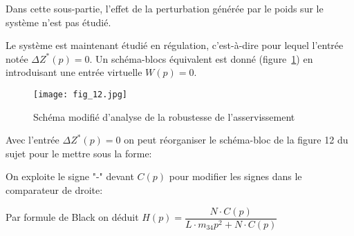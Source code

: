 Dans cette sous-partie, l'effet de la perturbation générée par le poids sur le système n'est pas étudié.

Le système est maintenant étudié en régulation, c'est-à-dire pour lequel l'entrée notée $\Delta Z^{*}(p)=0$. Un schéma-blocs équivalent est donné (figure~\ref{fig:12}) en introduisant une entrée virtuelle $W(p)=0$.

\begin{figure}[H]
\centering
\texttt{[image: fig\_12.jpg]}
\caption{\label{fig:12} Schéma modifié d'analyse de la robustesse de l'asservissement}
\end{figure}
\fi


\ifprof
\begin{corrige}
Avec l'entrée $\Delta Z^*(p) = 0$ on peut réorganiser le schéma-bloc de la figure 12 du sujet pour le mettre sous la forme:

\begin{center}
\end{center}

On exploite le signe "-" devant $C(p)$ pour modifier les signes dans le comparateur de droite:

\begin{center}
\end{center}

Par formule de Black on déduit $\boxed{H(p) = \dfrac{N\cdot C(p)}{L\cdot m_{34}p^2 + N\cdot C(p)}}$

\end{corrige}
\else
\fi

